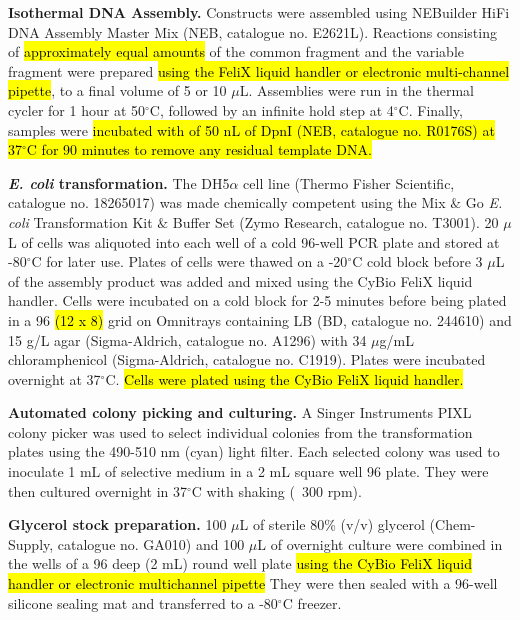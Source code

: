 \textbf{Isothermal DNA Assembly.}
Constructs were assembled using NEBuilder HiFi DNA Assembly Master Mix (NEB, catalogue no. E2621L).
Reactions consisting of \hl{approximately equal amounts} of the common fragment and the variable fragment were prepared \hl{using the FeliX liquid handler or electronic multi-channel pipette}, to a final volume of 5 or 10 $\mu$L.
Assemblies were run in the thermal cycler for 1 hour at 50$^{\circ}$C, followed by an infinite hold step at 4$^{\circ}$C.
Finally, samples were \hl{incubated with of 50 nL of DpnI (NEB, catalogue no. R0176S) at 37$^{\circ}$C for 90 minutes to remove any residual template DNA.}

\textbf{\textit{E. coli} transformation.}
The DH5$\alpha$ cell line (Thermo Fisher Scientific, catalogue no. 18265017) was made chemically competent using the Mix $\&$ Go \textit{E. coli} Transformation Kit $\&$ Buffer Set (Zymo Research, catalogue no. T3001).
20 $\mu$L of cells was aliquoted into each well of a cold 96-well PCR plate and stored at -80$^{\circ}$C for later use.
Plates of cells were thawed on a -20$^{\circ}$C cold block before 3 $\mu$L of the assembly product was added and mixed using the CyBio FeliX liquid handler.
Cells were incubated on a cold block for 2-5 minutes before being plated in a 96 \hl{(12 x 8)} grid on Omnitrays containing LB (BD, catalogue no. 244610) and 15 g/L agar (Sigma-Aldrich, catalogue no. A1296) with 34 $\mu$g/mL chloramphenicol (Sigma-Aldrich, catalogue no. C1919).
Plates were incubated overnight at 37$^{\circ}$C. \hl{Cells were plated using the CyBio FeliX liquid handler.}

\textbf{Automated colony picking and culturing.}
A Singer Instruments PIXL colony picker was used to select individual colonies from the transformation plates using the 490-510 nm (cyan) light filter.
Each selected colony was used to inoculate 1 mL of selective medium in a 2 mL square well 96 plate.
They were then cultured overnight in 37$^{\circ}$C with shaking (~300 rpm).

\textbf{Glycerol stock preparation.}
100 $\mu$L of sterile 80\% (v/v) glycerol (Chem-Supply, catalogue no. GA010) and 100 $\mu$L of overnight culture were combined in the wells of a 96 deep (2 mL) round well plate \hl{using the CyBio FeliX liquid handler or electronic multichannel pipette}
They were then sealed with a 96-well silicone sealing mat and transferred to a -80$^{\circ}$C freezer.

